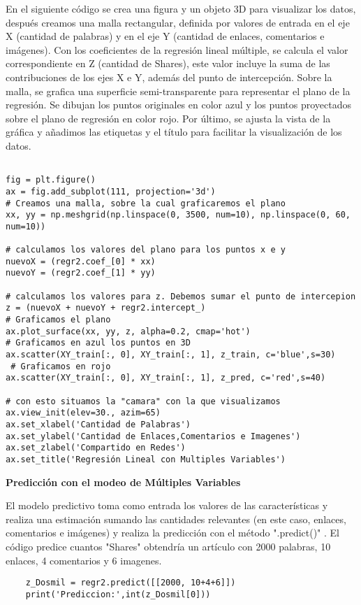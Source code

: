 \documentclass{pssbmac}
\begin{document}
En el siguiente código se crea una figura y un objeto 3D para visualizar los datos, después creamos una malla rectangular, definida por valores de entrada en el eje X (cantidad de palabras) y en el eje Y (cantidad de enlaces, comentarios e imágenes). 
Con los coeficientes de la regresión lineal múltiple, se calcula el valor correspondiente en Z (cantidad de Shares), este valor incluye la suma de las contribuciones de los ejes X e Y, además del punto de intercepción.
Sobre la malla, se grafica una superficie semi-transparente para representar el plano de la regresión. Se dibujan los puntos originales en color azul y los puntos proyectados sobre el plano de regresión en color rojo. Por último, se ajusta la vista de la gráfica y añadimos las etiquetas y el título para facilitar la visualización de los datos.
\begin{lstlisting}
    
fig = plt.figure()
ax = fig.add_subplot(111, projection='3d')
# Creamos una malla, sobre la cual graficaremos el plano
xx, yy = np.meshgrid(np.linspace(0, 3500, num=10), np.linspace(0, 60, num=10))

# calculamos los valores del plano para los puntos x e y
nuevoX = (regr2.coef_[0] * xx)
nuevoY = (regr2.coef_[1] * yy)

# calculamos los valores para z. Debemos sumar el punto de intercepion
z = (nuevoX + nuevoY + regr2.intercept_)
# Graficamos el plano
ax.plot_surface(xx, yy, z, alpha=0.2, cmap='hot')
# Graficamos en azul los puntos en 3D
ax.scatter(XY_train[:, 0], XY_train[:, 1], z_train, c='blue',s=30)
 # Graficamos en rojo
ax.scatter(XY_train[:, 0], XY_train[:, 1], z_pred, c='red',s=40)

# con esto situamos la "camara" con la que visualizamos
ax.view_init(elev=30., azim=65)
ax.set_xlabel('Cantidad de Palabras')
ax.set_ylabel('Cantidad de Enlaces,Comentarios e Imagenes')
ax.set_zlabel('Compartido en Redes')
ax.set_title('Regresión Lineal con Multiples Variables')
\end{lstlisting}

\vspace{.4cm}
\textbf{Predicción con el modeo de Múltiples Variables}

El modelo predictivo toma como entrada los valores de las características y realiza una estimación sumando las cantidades relevantes (en este caso, enlaces, comentarios e imágenes) y realiza la predicción con el método ".predict()" . 
El código predice cuantos "Shares" obtendría un artículo con 2000 palabras, 10 enlaces, 4 comentarios y 6 imagenes.
\begin{lstlisting}
    z_Dosmil = regr2.predict([[2000, 10+4+6]])
    print('Prediccion:',int(z_Dosmil[0]))
\end{lstlisting}
\end{document}
